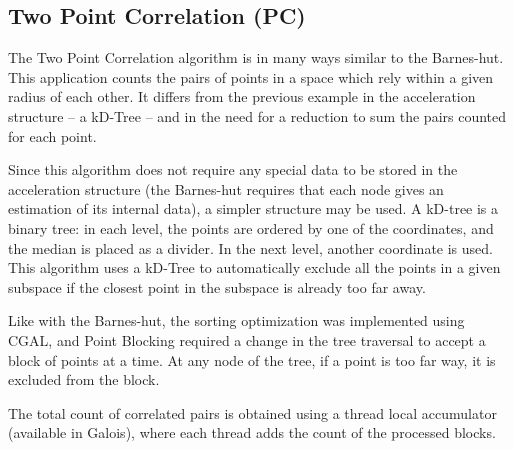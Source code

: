 \subsection{Two Point Correlation (PC)}
\label{sec:cases:pointcorr}

The Two Point Correlation algorithm is in many ways similar to the Barnes-hut. This application counts the pairs of points in a space which rely within a given radius of each other. It differs from the previous example in the acceleration structure -- a kD-Tree -- and in the need for a reduction to sum the pairs counted for each point.

Since this algorithm does not require any special data to be stored in the acceleration structure (the Barnes-hut requires that each node gives an estimation of its internal data), a simpler structure may be used. A kD-tree is a binary tree: in each level, the points are ordered by one of the coordinates, and the median is placed as a divider. In the next level, another coordinate is used. This algorithm uses a kD-Tree to automatically exclude all the points in a given subspace if the closest point in the subspace is already too far away.

Like with the Barnes-hut, the sorting optimization was implemented using CGAL, and Point Blocking required a change in the tree traversal to accept a block of points at a time. At any node of the tree, if a point is too far way, it is excluded from the block.

The total count of correlated pairs is obtained using a thread local accumulator (available in Galois), where each thread adds the count of the processed blocks.